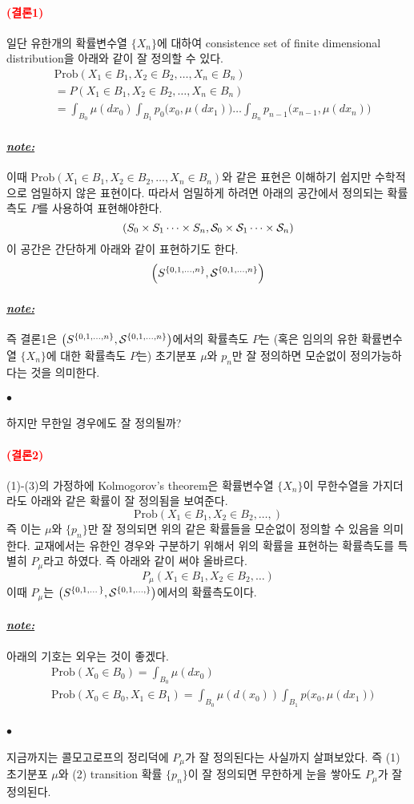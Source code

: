 \documentclass[12pt,oneside,english]{book}
\def\ck{\paragraph{\Large$\bullet$}\Large}
\def\note{\paragraph{\Large\textit{\underline{note:}}}\Large}
\newcommand{\parared}[1]{\paragraph{\Large\textcolor{red}{(#1)}}\Large}
\begin{document}
\parared{결론1} 일단 유한개의 확률변수열 $\{X_n\}$에 대하여 consistence set of finite dimensional distribution을 아래와 같이 잘 정의할 수 있다. 
\begin{align*}
& \mbox{Prob}(X_1\in B_1, X_2\in B_2, \dots, X_n \in B_n)\\
& = P(X_1\in B_1, X_2\in B_2, \dots, X_n \in B_n)\\
& = \int_{B_0}\mu(dx_0)\int_{B_1}p_0\big(x_0,\mu(dx_1)\big)\dots\int_{B_n}p_{n-1}\big(x_{n-1},\mu(dx_n)\big)
\end{align*}
\note 이때 $\mbox{Prob}(X_1\in B_1, X_2\in B_2, \dots, X_n \in B_n)$와 같은 표현은 이해하기 쉽지만 수학적으로 엄밀하지 않은 표현이다. 따라서 엄밀하게 하려면 아래의 공간에서 정의되는 확률측도 $P$를 사용하여 표현해야한다. 
\[
(S_0\times S_1 \dots \times S_n, {\cal S}_0\times {\cal S}_1 \dots \times {\cal S}_n)
\]
이 공간은 간단하게 아래와 같이 표현하기도 한다. 
\[
\left(S^{\{0,1,\dots,n\}},{\cal S}^{\{0,1,\dots,n\}}\right)
\]

\note 즉 결론1은 $\left(S^{\{0,1,\dots,n\}},{\cal S}^{\{0,1,\dots,n\}}\right)$에서의 확률측도 $P$는 (혹은 임의의 유한 확률변수열 $\{X_n\}$에 대한 확률측도 $P$는) 초기분포 $\mu$와 $p_n$만 잘 정의하면 모순없이 정의가능하다는 것을 의미한다.

\ck 하지만 무한일 경우에도 잘 정의될까? 

\parared{결론2} (1)-(3)의 가정하에 Kolmogorov's theorem은 확률변수열 $\{X_n\}$이 무한수열을 가지더라도 아래와 같은 확률이 잘 정의됨을 보여준다. 
\[
\mbox{Prob}(X_1\in B_1, X_2\in B_2, \dots, )
\]
즉 이는 $\mu$와 $\{p_n\}$만 잘 정의되면 위의 같은 확률들을 모순없이 정의할 수 있음을 의미한다. 교재에서는 유한인 경우와 구분하기 위해서 위의 확률을 표현하는 확률측도를 특별히 $P_{\mu}$라고 하였다. 즉 아래와 같이 써야 올바르다. 
\[
P_{\mu}(X_1\in B_1, X_2\in B_2, \dots)
\]
이때 $P_{\mu}$는 $\left(S^{\{0,1,\dots\}},{\cal S}^{\{0,1,\dots,\}}\right)$에서의 확률측도이다. 

\note 아래의 기호는 외우는 것이 좋겠다. 
\begin{align*}
& \mbox{Prob}(X_0\in B_0)= \int_{B_0} \mu(dx_0)\\ 
& \mbox{Prob}(X_0\in B_0,X_1 \in B_1)= \int_{B_0} \mu(d(x_0)) \int_{B_1} p\big(x_0,\mu(dx_1)\big) \\ 
\end{align*}

\ck 지금까지는 콜모고로프의 정리덕에 $P_{\mu}$가 잘 정의된다는 사실까지 살펴보았다. 즉 (1) 초기분포 $\mu$와 (2) transition 확률 $\{p_n\}$이 잘 정의되면 무한하게 눈을 쌓아도 $P_{\mu}$가 잘 정의된다. 
\end{document}
